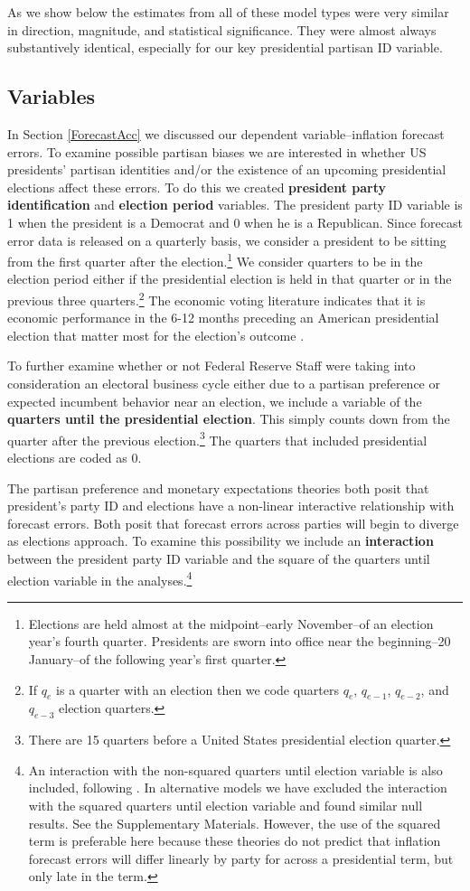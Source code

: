 \documentclass[a4paper]{article}
\begin{document}
As we show below the estimates from all of these model types were very similar in direction, magnitude, and statistical significance. They were almost always substantively identical, especially for our key presidential partisan ID variable.

\subsection{Variables}

In Section \ref{ForecastAcc} we discussed our dependent variable--inflation forecast errors. To examine possible partisan biases we are interested in whether US presidents' partisan identities and/or the existence of an upcoming presidential elections affect these errors. To do this we created {\bf{president party identification}} and {\bf{election period}} variables. The president party ID variable is 1 when the president is a Democrat and 0 when he is a Republican. Since forecast error data is released on a quarterly basis, we consider a president to be sitting from the first quarter after the election.\footnote{Elections are held almost at the midpoint--early November--of an election year's fourth quarter. Presidents are sworn into office near the beginning--20 January--of the following year's first quarter.} We consider quarters to be in the election period either if the presidential election is held in that quarter or in the previous three quarters.\footnote{If $q_{e}$ is a quarter with an election then we code quarters $q_{e}$, $q_{e-1}$, $q_{e-2}$, and $q_{e-3}$ election quarters.} The economic voting literature indicates that it is economic performance in the 6-12 months preceding an American presidential election that matter most for the election's outcome \citep[c.f][]{Gelman1993}.

To further examine whether or not Federal Reserve Staff were taking into consideration an electoral business cycle either due to a partisan preference or expected incumbent behavior near an election, we include a variable of the {\bf{quarters until the presidential election}}. This simply counts down from the quarter after the previous election.\footnote{There are 15 quarters before a United States presidential election quarter.} The quarters that included presidential elections are coded as 0.

The partisan preference and monetary expectations theories both posit that president's party ID and elections have a non-linear interactive relationship with forecast errors. Both posit that forecast errors across parties will begin to diverge as elections approach. To examine this possibility we include an \textbf{interaction} between the president party ID variable and the square of the quarters until election variable in the analyses.\footnote{An interaction with the non-squared quarters until election variable is also included, following \citep{Brambor2006}. In alternative models we have excluded the interaction with the squared quarters until election variable and found similar null results. See the Supplementary Materials. However, the use of the squared term is preferable here because these theories do not predict that inflation forecast errors will differ linearly by party for across a presidential term, but only late in the term.}
\end{document}
